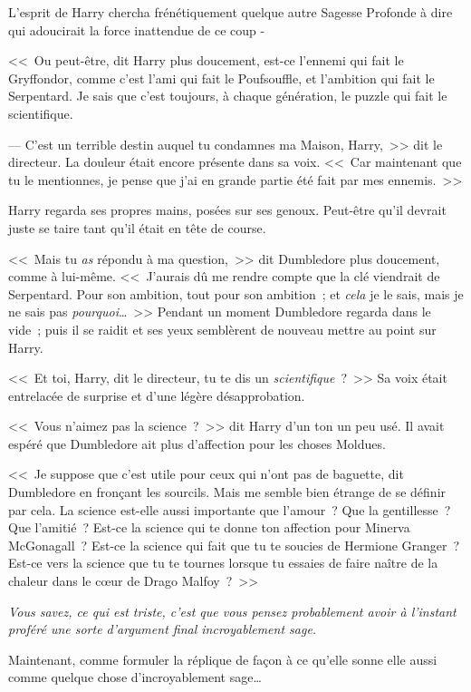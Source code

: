 L'esprit de Harry chercha frénétiquement quelque autre Sagesse Profonde à dire qui adoucirait la force inattendue de ce coup -

<<~Ou peut-être, dit Harry plus doucement, est-ce l'ennemi qui fait le Gryffondor, comme c'est l'ami qui fait le Poufsouffle, et l'ambition qui fait le Serpentard. Je sais que c'est toujours, à chaque génération, le puzzle qui fait le scientifique.

--- C'est un terrible destin auquel tu condamnes ma Maison, Harry,~>> dit le directeur. La douleur était encore présente dans sa voix. <<~Car maintenant que tu le mentionnes, je pense que j'ai en grande partie été fait par mes ennemis.~>>

Harry regarda ses propres mains, posées sur ses genoux. Peut-être qu'il devrait juste se taire tant qu'il était en tête de course.

<<~Mais tu \emph{as} répondu à ma question,~>> dit Dumbledore plus doucement, comme à lui-même. <<~J'aurais dû me rendre compte que la clé viendrait de Serpentard. Pour son ambition, tout pour son ambition~; et \emph{cela} je le sais, mais je ne sais pas \emph{pourquoi}…~>> Pendant un moment Dumbledore regarda dans le vide~; puis il se raidit et ses yeux semblèrent de nouveau mettre au point sur Harry.

<<~Et toi, Harry, dit le directeur, tu te dis un \emph{scientifique}~?~>> Sa voix était entrelacée de surprise et d'une légère désapprobation.

<<~Vous n'aimez pas la science~?~>> dit Harry d'un ton un peu usé. Il avait espéré que Dumbledore ait plus d'affection pour les choses Moldues.

<<~Je suppose que c'est utile pour ceux qui n'ont pas de baguette, dit Dumbledore en fronçant les sourcils. Mais me semble bien étrange de se définir par cela. La science est-elle aussi importante que l'amour~? Que la gentillesse~? Que l'amitié~? Est-ce la science qui te donne ton affection pour Minerva McGonagall~? Est-ce la science qui fait que tu te soucies de Hermione Granger~? Est-ce vers la science que tu te tournes lorsque tu essaies de faire naître de la chaleur dans le cœur de Drago Malfoy~?~>>

\emph{Vous savez, ce qui est triste, c'est que vous pensez probablement avoir à l'instant proféré une sorte d'argument final incroyablement sage.}

Maintenant, comme formuler la réplique de façon à ce qu'elle sonne elle aussi comme quelque chose d'incroyablement sage…

